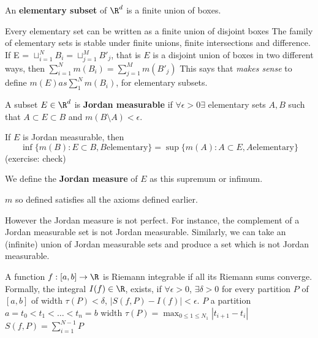\documentclass{article}
\begin{document}
\begin{enumerate}
        \begin{defi}
            An \textbf{elementary subset} of $\R^d$ is a finite union of boxes.
        \end{defi}
        \begin{remark}
            Every elementary set can be written as a finite union of disjoint boxes
            The family of elementary sets is stable under finite unions, finite intersections and difference.
            If E = $\sqcup_{i=1}^N B_i = \sqcup_{j=1}^M B'_j$, that is $E$ is a disjoint union of boxes in two different ways, then
            $\sum_{i=1}^N m(B_i) = \sum_{j=1}^M m(B'_j)$
            This says that \emph{makes sense} to define $m(E) as \sum_1^N m(B_i)$, for elementary subsets.
        \end{remark}
\end{enumerate}

\begin{defi}
    A subset $E \in \R^d$ is \textbf{Jordan measurable} if $\forall \epsilon > 0 \exists$ elementary sets $A, B$ such that $A \subset E \subset B$ and $m(B\setminus A) < \epsilon$.
\end{defi}
\begin{remark}
    If $E$ is Jordan measurable, then
    \begin{equation}
        \inf\{m(B): E \subset B, B \mathrm{elementary}\} = \sup\{m(A): A \subset E, A \mathrm{elementary}\}
    \end{equation}
    (exercise: check)
\end{remark}
\begin{defi}
    We define the \textbf{Jordan measure} of $E$ as this supremum or infimum.
\end{defi}
\begin{exercise}
    $m$ so defined satisfies all the axioms defined earlier.
\end{exercise}
However the Jordan measure is not perfect. For instance, the complement of a Jordan measurable set is not Jordan measurable.  Similarly, we can take an (infinite) union of Jordan measurable sets and produce a set which is not Jordan measurable.

\begin{defi}
    A function $f:[a, b] \to \R$ is Riemann integrable if all its Riemann sums converge.
    Formally, the integral $I(f) \in \R$, exists, if $\forall \epsilon > 0$, $\exists \delta > 0$ for every partition $P$ of $[a, b]$ of width $\tau(P) < \delta$,
    $|S(f, P) - I(f)| < \epsilon$.
$P$ a partition $a = t_0 < t_1 < \dots < t_n = b$ width $\tau(P) = \max_{0 \leq 1 \leq N_1} |t_{i+1} - t_i|$
$S(f, P) = \sum_{i=1}^{N-1} P$
\end{defi}
\end{document}
